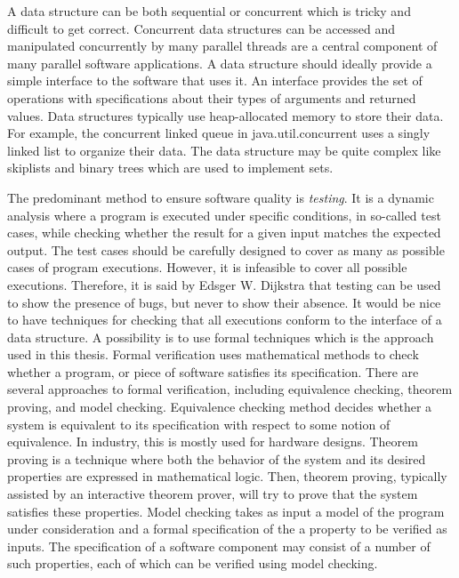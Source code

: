 A data structure can be both sequential or concurrent which is tricky and difficult to get correct. Concurrent data structures can be accessed and manipulated concurrently by many parallel threads are a central component of many parallel software applications. A data structure should ideally provide a simple interface to the software that uses it. An interface provides the set of operations with specifications about their types of arguments and returned values. Data structures typically use heap-allocated memory to store their data. For example, the concurrent linked queue in java.util.concurrent uses a singly linked list to organize their data. The data structure may be quite complex like skiplists and binary trees which are used to implement sets.


The predominant method to ensure software quality is
\emph{testing}. It is a dynamic analysis where a program is executed under specific conditions, in so-called test cases, while checking whether the result for a given input matches the expected output. The test cases should be carefully designed to cover as many as possible cases of program executions.
However, it is infeasible to cover all possible executions. Therefore, it is said by Edsger W. Dijkstra that testing can be used to show the presence of bugs, but never to show their absence.  It would be nice to have techniques for checking that all executions conform to the interface of a data structure.
A possibility is to use formal techniques which is the approach used in this thesis. 
Formal verification uses mathematical methods to check whether a program, or piece of software satisfies its specification. 
There are several approaches to formal verification, including equivalence checking, theorem proving, and model checking. Equivalence checking method decides whether a system is equivalent to its specification with respect to some notion of equivalence. In industry, this is mostly used for hardware designs. Theorem proving is a technique where both the behavior of the system and its desired properties are expressed in mathematical logic. Then, theorem proving, typically assisted by an interactive theorem prover, will try to prove that the system satisfies these properties. Model checking takes as input a model of the program under consideration and a formal specification of the a property to be verified as inputs. The specification of a software component may consist of a number of such properties, each of which can be verified using model checking. 

